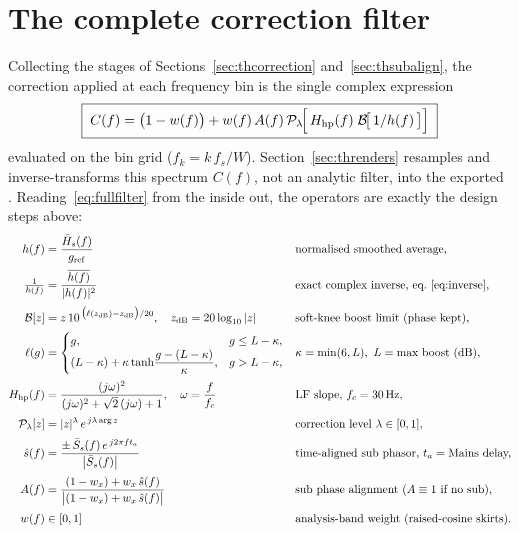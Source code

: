 \section{The complete correction filter}\label{sec:fullfilter}
Collecting the stages of Sections~\ref{sec:thcorrection} and~\ref{sec:thsubalign}, the correction applied at each frequency bin is the single complex expression
\begin{equation}
  \boxed{\;
  C(f) = \bigl(1-w(f)\bigr)
       + w(f)\,A(f)\,
         \mathcal{P}_{\lambda}\!\Bigl[\,
           H_{\mathrm{hp}}(f)\;\mathcal{B}\!\bigl[\,1/h(f)\,\bigr]
         \Bigr]\; }
  \label{eq:fullfilter}
\end{equation}
evaluated on the  bin grid ($f_k = k\,f_s/W$). Section~\ref{sec:threnders} resamples and inverse-transforms this spectrum $C(f)$, not an analytic filter, into the exported . Reading~\eqref{eq:fullfilter} from the inside out, the operators are exactly the design steps above:
\begin{align}
  h(f) &= \frac{\bar H_s(f)}{g_{\mathrm{ref}}}
        && \text{normalised smoothed average,}\\[2pt]
  \tfrac{1}{h(f)} &= \frac{\overline{h(f)}}{|h(f)|^{2}}
        && \text{exact complex inverse, eq.~\eqref{eq:inverse},}\\[2pt]
  \mathcal{B}[z] &= z\,10^{\,\bigl(\ell(z_{\mathrm{dB}})-z_{\mathrm{dB}}\bigr)/20},\quad
        z_{\mathrm{dB}}=20\log_{10}|z|
        && \text{soft-knee boost limit (phase kept),}\\[2pt]
  \ell(g) &= \begin{cases}
               g, & g \le L-\kappa,\\
               (L-\kappa) + \kappa\tanh\!\dfrac{g-(L-\kappa)}{\kappa}, & g > L-\kappa,
             \end{cases}
        && \kappa=\min(6,L),\ L=\text{max boost (dB)},\\[2pt]
  H_{\mathrm{hp}}(f) &= \frac{(j\omega)^2}{(j\omega)^2+\sqrt{2}\,(j\omega)+1},\quad
        \omega=\frac{f}{f_c}
        && \text{LF slope, } f_c=\SI{30}{\hertz},\\[2pt]
  \mathcal{P}_{\lambda}[z] &= |z|^{\lambda}\,e^{\,j\lambda\arg z}
        && \text{correction level } \lambda\in[0,1],\\[2pt]
  \hat s(f) &= \frac{\pm\,\bar S_s(f)\,e^{\,j2\pi f t_a}}{\bigl|\bar S_s(f)\bigr|}
        && \text{time-aligned sub phasor, } t_a=\text{Mains delay,}\\[2pt]
  A(f) &= \frac{(1-w_x)+w_x\,\hat s(f)}{\bigl|(1-w_x)+w_x\,\hat s(f)\bigr|}
        && \text{sub phase alignment } (A\equiv 1 \text{ if no sub}),\\[2pt]
  w(f) &\in [0,1]
        && \text{analysis-band weight (raised-cosine skirts).}
\end{align}
